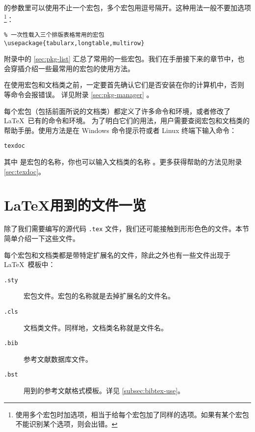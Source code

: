 的参数里可以使用不止一个宏包，多个宏包用逗号隔开。这种用法一般不要加选项%
\footnote{使用多个宏包时加选项，相当于给每个宏包加了同样的选项。如果有某个宏包不能识别某个选项，则会出错。}：
\begin{verbatim}
% 一次性载入三个排版表格常用的宏包
\usepackage{tabularx,longtable,multirow}
\end{verbatim}

附录中的 \ref{sec:pkg-list} 汇总了常用的一些宏包。我们在手册接下来的章节中，也会穿插介绍一些最常用的宏包的使用方法。

在使用宏包和文档类之前，一定要首先确认它们是否安装在你的计算机中，否则  等命令会报错误。
详见附录 \ref{sec:pkg-manager} 。

每个宏包（包括前面所说的文档类）都定义了许多命令和环境，或者修改了 \LaTeX\ 已有的命令和环境。
为了明白它们的用法，用户需要查阅宏包和文档类的帮助手册。使用方法是在 Windows 命令提示符或者 Linux 终端下输入命令：
\begin{command}
\texttt{texdoc} 
\end{command}

其中  是宏包的名称，你也可以输入文档类的名称 。更多获得帮助的方法见附录 \ref{sec:texdoc}。

\section{\LaTeX 用到的文件一览}\label{sec:latex-files}

除了我们需要编写的源代码 \texttt{.tex} 文件，我们还可能接触到形形色色的文件。本节简单介绍一下这些文件。

每个宏包和文档类都是带特定扩展名的文件，除此之外也有一些文件出现于 \LaTeX\ 模板中：
\begin{description}
  \item[\texttt{.sty}] 宏包文件。宏包的名称就是去掉扩展名的文件名。
  \item[\texttt{.cls}] 文档类文件。同样地，文档类名称就是文件名。
  \item[\texttt{.bib}]  参考文献数据库文件。
  \item[\texttt{.bst}]  用到的参考文献格式模板。详见 \ref{subsec:bibtex-use}。
\end{description}

